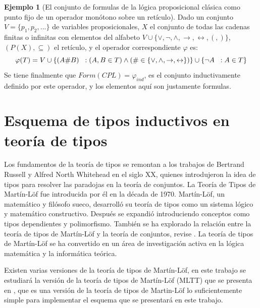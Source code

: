 \documentclass[11pt,oneside]{report}
\theoremstyle{plain}
\theoremstyle{definition}
\newtheorem{ejemplo}{Ejemplo}[chapter]
\begin{document}
\begin{ejemplo}[El conjunto de formulas de la lógica proposicional clásica como punto fijo de un operador monótono sobre un retículo]
    Dado un conjunto $V = \{p_1, p_2,...\}$ de variables proposicionales, $X$ el conjunto de todas las cadenas finitas o infinitas con elementos del alfabeto $V\cup\{\lor, \lnot, \land, \rightarrow, \leftrightarrow, (, )\}$, $(P(X),\subseteq)$ el retículo, y el operador correspondiente $\varphi$ es:
    $$\varphi(T) = V \cup \{(A \# B) \hspace{2mm}: (A , B\in T) \land (\#\in \{\lor, \land, \rightarrow, \leftrightarrow\})\}\cup \{\lnot A \hspace{2mm}:A\in T\}$$
    Se tiene finalmente que $Form(CPL) = \varphi_{ind}$, es el conjunto inductivamente definido por este operador, y los elementos aquí son justamente formulas.\\
\end{ejemplo}

\chapter{Esquema de tipos inductivos en teoría de tipos}

Los fundamentos de la teoría de tipos se remontan a los trabajos de Bertrand Russell y Alfred North Whitehead en el siglo XX, quienes introdujeron la idea de tipos para resolver las paradojas en la teoría de conjuntos. La Teoría de Tipos de Martín-Löf fue introducida por él en la década de 1970. Martín-Löf, un matemático y filósofo sueco, desarrolló su teoría de tipos como un sistema lógico y matemático constructivo. Después se expandió introduciendo conceptos como tipos dependientes y polimorfismo. También se ha explorado la relación entre la teoría de tipos de Martín-Löf y la teoría de conjuntos, revise \cite{Peter Dybjer}. La teoría de tipos de Martín-Löf se ha convertido en un área de investigación activa en la lógica matemática y la informática teórica.

Existen varias versiones de la teoría de tipos de Martín-Löf, en este trabajo se estudiará la versión de la teoría de tipos de Martín-Löf (MLTT) que se presenta en \cite{Peter Dybjer}, que es una versión de la teoría de tipos de Martin-Löf lo suficientemente simple para implementar el esquema que se presentará en este trabajo.
\end{document}
